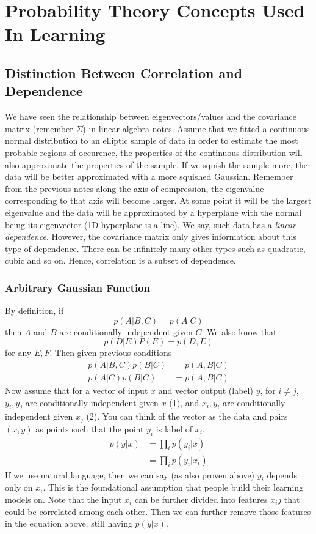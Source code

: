 \documentclass{article}
\numberwithin{equation}{subsection}
\begin{document}
\section{Probability Theory Concepts Used In Learning}
\subsection{Distinction Between Correlation and Dependence}
We have seen the relationship between eigenvectors/values and the covariance matrix (remember $\Sigma$) in linear algebra notes. Assume that we fitted a continuous normal distribution to an elliptic
sample of data in order to estimate the most probable regions of occurence, the properties of the continuous distribution will also approximate the properties of the sample. If we squish the sample more, the data will be better approximated with a more squished Gaussian. Remember from the previous notes along the axis of compression, the eigenvalue corresponding to that axis will become larger. At some point it will be the largest eigenvalue and the data will be approximated by a hyperplane with the normal being its eigenvector (1D hyperplane is a line). We say, such data has a \textit{linear dependence}. However, the covariance matrix only gives information about this type of dependence. There can be infinitely many other types such as quadratic, cubic and so on. Hence, correlation is a subset of dependence.  
\subsubsection{Arbitrary Gaussian Function}
By definition, if
\begin{equation}
    p(A|B,C) = p(A|C)
\end{equation}
then $A$ and $B$ are conditionally independent given $C$. We also know that 
\begin{equation}
    p(D|E)P(E) = p(D,E)
\end{equation}
for any $E, F$. Then given previous conditions
\begin{align}
    p(A|B,C)p(B|C) &= p(A,B|C)\\
    p(A|C)p(B|C) &= p(A,B|C)
\end{align}
Now assume that for a vector of input $x$ and vector output (label) $y$, for $i \neq j$, $y_i, y_j$ are conditionally independent given $x$ (1), and $x_i, y_i$ are conditionally independent given $x_j$ (2). You can think of the vector as the data and pairs $(x,y)$ as points such that the point $y_i$ is label of $x_i$.
\begin{align}
    p(y|x) &= \prod_i p(y_i|x)\\
           &= \prod_i p(y_i|x_i)
\end{align}
If we use natural language, then we can say (as also proven above) $y_i$ depends only on $x_i$. This is the foundational assumption that people build their learning models on. Note that the input $x_i$ can be further divided into features $x_ij$ that could be correlated among each other. Then we can further remove those features in the equation above, still having $p(y|x)$. 
\end{document}

